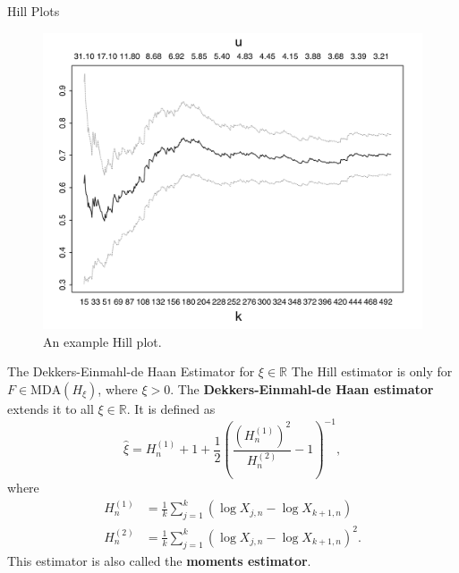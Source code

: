 \documentclass{beamer}
\newcommand{\MDA}{\text{MDA}}
\begin{document}
\begin{frame}{Hill Plots}
    \begin{figure}
        \centering
        \includegraphics[scale=0.35]{hill_plot.png}
        \caption{An example Hill plot.}
        \label{fig:hill_plot}
    \end{figure}
\end{frame}

\begin{frame}{The Dekkers-Einmahl-de Haan Estimator for $\xi \in \mathbb{R}$}
    The Hill estimator is only for $F \in \MDA(H_{\xi})$, where $\xi > 0$. The \textbf{Dekkers-Einmahl-de Haan estimator} extends it to all $\xi \in \mathbb{R}$. It is defined as
    \[
    \hat{\xi} = H_n^{(1)} + 1 + \frac{1}{2}\left(\frac{(H_n^{(1)})^2}{H_n^{(2)}} - 1\right)^{-1},
    \]
    where
    \begin{align*}
        H_n^{(1)} &= \frac{1}{k}\sum_{j = 1}^k (\log X_{j, n} - \log X_{k + 1, n}) \\
        H_n^{(2)} &= \frac{1}{k}\sum_{j = 1}^k (\log X_{j, n} - \log X_{k + 1, n})^2.
    \end{align*}
    This estimator is also called the \textbf{moments estimator}. 
\end{frame}
\end{document}
